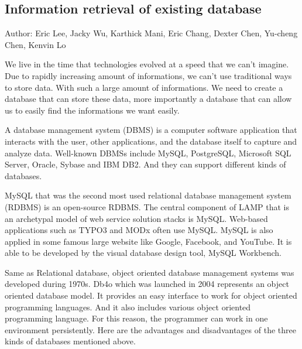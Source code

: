 	
\subsection{Information retrieval of existing database}
Author: Eric Lee, Jacky Wu, Karthick Mani, Eric Chang, Dexter Chen, Yu-cheng Chen, Kenvin Lo

We live in the time that technologies evolved at a speed that we can't imagine. Due to rapidly increasing amount of informations, we can't use traditional ways to store data. With such a large amount of informations. We need to create a database that can store these data, more importantly a database that can allow us to easily find the informations we want easily.

A database management system (DBMS) is a computer software application that interacts with the user, other applications, and the database itself to capture and analyze data. Well-known DBMSs include MySQL, PostgreSQL, Microsoft SQL Server, Oracle, Sybase and IBM DB2. And they can support different kinds of databases.

MySQL that was the second most used relational database management system (RDBMS) is an open-source RDBMS. The central component of LAMP that is an archetypal model of web service solution stacks is MySQL. Web-based applications such as TYPO3 and MODx often use MySQL. MySQL is also applied in some famous large website like Google, Facebook, and YouTube. It is able to be developed by the visual database design tool, MySQL Workbench.

Same as Relational database, object oriented database management systems was developed during 1970s. Db4o which was launched in 2004 represents an object oriented database model. It provides an easy interface to work for object oriented programming languages. And it also includes various object oriented programming language. For this reason, the programmer can work in one environment persistently. Here are the advantages and disadvantages of the three kinds of databases mentioned above.

